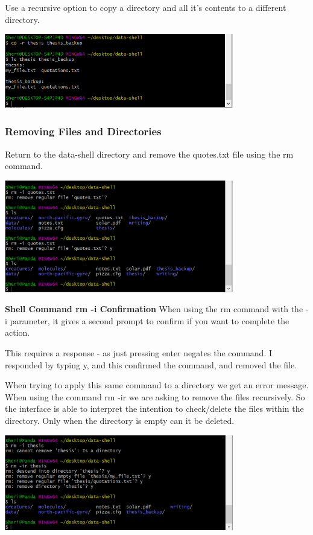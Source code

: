 \documentclass{article}
\begin{document}
Use a recursive option to copy a directory and all it's contents to a different directory.

\includegraphics[width=10cm]{Images/GitBash_021.PNG}

\subsubsection{Removing Files and Directories}
Return to the data-shell directory and remove the quotes.txt file using the rm command.

\includegraphics[width=10cm]{Images/GitBash_025.PNG}

\textbf{Shell Command rm -i Confirmation}
\label{ Error: Shell Command rm -i Confrimation}
When using the rm command with the -i parameter, it gives a second prompt to confirm if you want to complete the action. 

This requires a response - as just pressing enter negates the command. I responded by typing y, and this confirmed the command, and removed the file.

When trying to apply this same command to a directory we get an error message.
When using the command rm -ir we are asking to remove the files recursively. So the interface is able to interpret the intention to check/delete the files within the directory. Only when  the directory is empty can it be deleted.

\includegraphics[width=10cm]{Images/GitBash_026.PNG}
\end{document}
